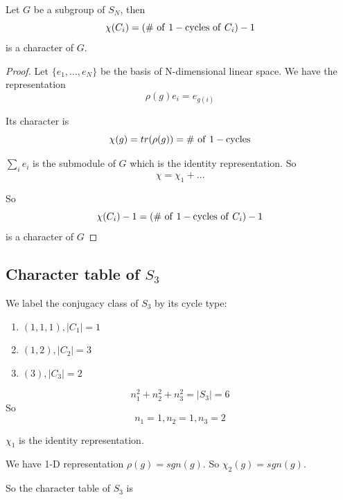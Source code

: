 \documentclass[12pt]{book}
\begin{document}
	\begin{theorem}
		Let $G$ be a subgroup of $S_N$, then
		\begin{equation}
			\chi(C_i)=(\#{\rm\ of\ 1-cycles\ of\ } C_i) -1
		\end{equation}
		is a character of $G$.
		\label{thm:repr_sn}
	\end{theorem}
	\begin{proof}
		Let $\{e_1,\dots,e_N\}$ be the basis of N-dimensional linear space. We have the representation
		\begin{equation}
			\rho(g)e_i=e_{g(i)}
		\end{equation}
	
		Its character is
		\begin{equation}
			\chi(g)=tr(\rho(g))=\#{\rm\ of\ 1-cycles}
		\end{equation}
	
		$\sum_i e_i$ is the submodule of $G$ which is the identity representation. So
		\begin{equation}
			\chi=\chi_1+\dots
		\end{equation}
	
		So 
		\begin{equation}
			\chi(C_i)-1=(\#{\rm\ of\ 1-cycles\ of\ } C_i) -1
		\end{equation}
		is a character of $G$
	\end{proof}

	
	\subsection{Character table of $S_3$}
	We label the conjugacy class of $S_3$ by its cycle type:
	\begin{enumerate}
		\item $(1,1,1),|C_1|=1$
		\item $(1,2),|C_2|=3$
		\item $(3),|C_3|=2$
	\end{enumerate}
	\begin{equation}
		n_1^2+n_2^2+n_3^2=|S_3|=6
	\end{equation}
	So
	\begin{equation}
		n_1=1, n_2=1, n_3=2
	\end{equation}
	
	$\chi_1$ is the identity representation.
	
	We have 1-D representation $\rho(g)=sgn(g)$. So $\chi_2(g)=sgn(g)$.
	
	So the character table of $S_3$ is
	
\end{document}

